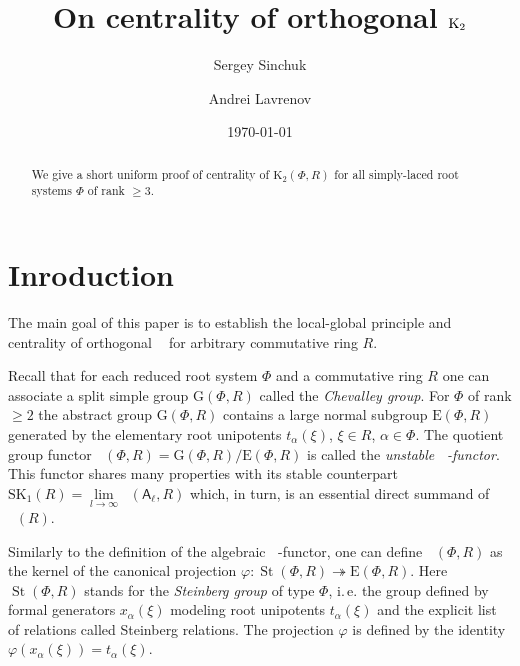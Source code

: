 \documentclass[11pt]{amsart}
\title{On centrality of orthogonal $\Kt$}
\author{Sergey Sinchuk}
\author {Andrei Lavrenov}
\date {\today}
\theoremstyle{plain} \declaretheorem[name=Theorem, Refname={Theorem,Theorems}]{tm} \Crefname{tm}{Theorem}{Theorems}
\numberwithin{equation}{section}
\theoremstyle{definition} \newtheorem{df}[lm]{Definition} \Crefname{df}{Definition}{Definitions}
\theoremstyle{remark} \newtheorem{rk}[lm]{Remark} \Crefname{rk}{Remark}{Remarks}
\newcommand{\E}{{\mathrm{E}}}
\newcommand{\GG}{{\mathrm{G}}}
\newcommand{\St}{\mathop{\mathrm{St}}\nolimits}
\newcommand{\Kt}{\mathop{\mathrm{K_2}}\nolimits}
\newcommand{\Ko}{\mathop{\mathrm{K_1}}\nolimits}
\newcommand{\rA}{\mathsf{A}}
\begin{document}
\begin{abstract} We give a short uniform proof of centrality of $\mathrm K_2(\Phi, R)$ for all simply-laced root systems $\Phi$ of rank $\geq 3$.
\end{abstract}

\maketitle


\section*{Inroduction}
The main goal of this paper is to establish the local-global principle and centrality of orthogonal $\Kt$ for arbitrary commutative ring $R$.

Recall that for each reduced root system $\Phi$ and a commutative ring $R$ one can associate a split simple group $\GG(\Phi, R)$ called the \emph{Chevalley group}.
For $\Phi$ of rank $\geq 2$ the abstract group $\GG(\Phi, R)$ contains a large normal subgroup $\E(\Phi, R)$ generated by the elementary root unipotents $t_\alpha(\xi)$, $\xi\in R$, $\alpha\in \Phi$.
The quotient group functor $\Ko(\Phi, R)=\GG(\Phi, R)/\E(\Phi, R)$ is called the \emph{unstable $\Ko$-functor}.
This functor shares many properties with its stable counterpart $\mathrm{SK}_1(R) = \lim\limits_{l\to\infty}\Ko(\rA_\ell, R)$ which, in turn, is an essential direct summand of $\Ko(R)$.

Similarly to the definition of the algebraic $\Kt$-functor, one can define $\Kt(\Phi, R)$ as the kernel of the canonical projection $\varphi\colon\St(\Phi, R)\twoheadrightarrow \E(\Phi, R)$.
Here $\St(\Phi, R)$ stands for the \emph{Steinberg group} of type $\Phi$, i.\,e. the group defined by formal generators $x_\alpha(\xi)$ modeling root unipotents $t_\alpha(\xi)$
and the explicit list of relations called Steinberg relations. The projection $\varphi$ is defined by the identity $\varphi(x_\alpha(\xi))=t_\alpha(\xi)$.
\end{document}
